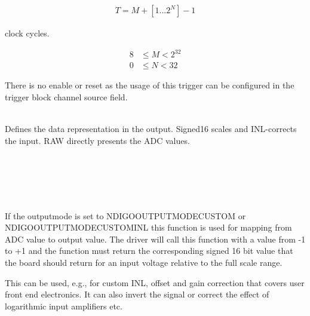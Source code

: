             \begin{align}
                T = M + [1...2^N] - 1
            \end{align}

            clock cycles.

            \begin{align}
                8 &\leq M < 2^{32}\\
                0 &\leq N < 32
            \end{align}

            There is no enable or reset as the usage of this trigger can be configured in the trigger block channel source field.\par

            \\
            Defines the data representation in the output. Signed16 scales and INL-corrects the input. RAW directly presents the ADC values.\par

            \\
            \\
            \\
            \par

            \\
            If the \textsf{output\tu mode} is set to \textsf{NDIGO\tu OUTPUT\tu MODE\tu CUSTOM} or\\\textsf{NDIGO\tu OUTPUT\tu MODE\tu CUSTOM\tu INL} this function is used for mapping from ADC value to output value. The driver will call this function with a value from -1 to +1 and the function must return the corresponding signed 16 bit value that the board should return for an input voltage relative to the full scale range.\par

             \par

            This can be used, e.g., for custom INL, offset and gain correction that covers user front end electronics. It can also invert the signal or correct the effect of logarithmic input amplifiers etc.\par

